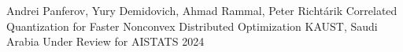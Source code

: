 
\begin{cventries}
  \cventry
    {Andrei Panferov, Yury Demidovich, Ahmad Rammal, Peter Richtárik} %
    {Correlated Quantization for Faster Nonconvex Distributed Optimization} %
    {KAUST, Saudi Arabia} %
    {Under Review for AISTATS 2024} %
    {}

    
\end{cventries}
